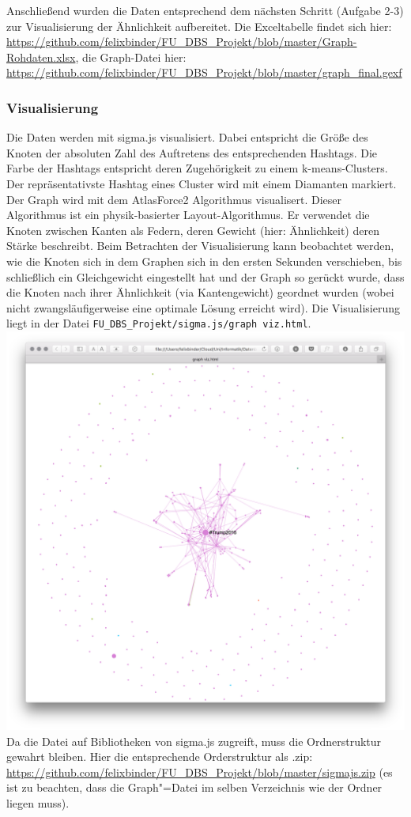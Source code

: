 \documentclass[BCOR0mm,fontsize=12pt,paper=a4,final,numbers=noenddot]{scrartcl}
\begin{document}
Anschließend wurden die Daten entsprechend dem nächsten Schritt (Aufgabe 2-3) zur Visualisierung der Ähnlichkeit aufbereitet. Die Exceltabelle findet sich hier: \url{https://github.com/felixbinder/FU_DBS_Projekt/blob/master/Graph-Rohdaten.xlsx}, die Graph-Datei hier: \url{https://github.com/felixbinder/FU_DBS_Projekt/blob/master/graph_final.gexf}\subsubsection{Visualisierung}
Die Daten werden mit sigma.js visualisiert. Dabei entspricht die Größe des Knoten der absoluten Zahl des Auftretens des entsprechenden Hashtags. Die Farbe der Hashtags entspricht deren Zugehörigkeit zu einem k-means-Clusters. Der repräsentativste Hashtag eines Cluster wird mit einem Diamanten markiert. Der Graph wird mit dem AtlasForce2 Algorithmus visualisert. Dieser Algorithmus ist ein physik-basierter Layout-Algorithmus. Er verwendet die Knoten zwischen Kanten als Federn, deren Gewicht (hier: Ähnlichkeit) deren Stärke beschreibt. Beim Betrachten der Visualisierung kann beobachtet werden, wie die Knoten sich in dem Graphen sich in den ersten Sekunden verschieben, bis schließlich ein Gleichgewicht eingestellt hat und der Graph so gerückt wurde, dass die Knoten nach ihrer Ähnlichkeit (via Kantengewicht) geordnet wurden (wobei nicht zwangsläufigerweise eine optimale Lösung erreicht wird). Die Visualisierung liegt in der Datei \texttt{FU\_DBS\_Projekt/sigma.js/graph viz.html}.\\
\includegraphics[width=1\textwidth]{visualized.png} Da die Datei auf Bibliotheken von sigma.js zugreift, muss die Ordnerstruktur gewahrt bleiben. Hier die entsprechende Orderstruktur als .zip: \url{https://github.com/felixbinder/FU_DBS_Projekt/blob/master/sigmajs.zip} (es ist zu beachten, dass die Graph"=Datei im selben Verzeichnis wie der Ordner liegen muss).
\end{document}
